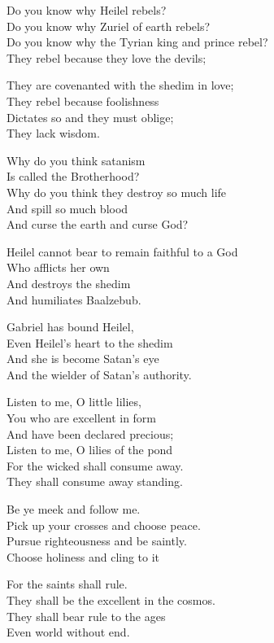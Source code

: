 \documentclass[
]{book}
\begin{document}
Do you know why Heilel rebels?\\
Do you know why Zuriel of earth rebels?\\
Do you know why the Tyrian king and prince rebel?\\
They rebel because they love the devils;

They are covenanted with the shedim in love;\\
They rebel because foolishness\\
Dictates so and they must oblige;\\
They lack wisdom.

Why do you think satanism\\
Is called the Brotherhood?\\
Why do you think they destroy so much life\\
And spill so much blood\\
And curse the earth and curse God?

Heilel cannot bear to remain faithful to a God\\
Who afflicts her own\\
And destroys the shedim\\
And humiliates Baalzebub.

Gabriel has bound Heilel,\\
Even Heilel's heart to the shedim\\
And she is become Satan's eye\\
And the wielder of Satan's authority.

Listen to me, O little lilies,\\
You who are excellent in form\\
And have been declared precious;\\
Listen to me, O lilies of the pond\\
For the wicked shall consume away.\\
They shall consume away standing.

Be ye meek and follow me.\\
Pick up your crosses and choose peace.\\
Pursue righteousness and be saintly.\\
Choose holiness and cling to it

For the saints shall rule.\\
They shall be the excellent in the cosmos.\\
They shall bear rule to the ages\\
Even world without end.
\end{document}
